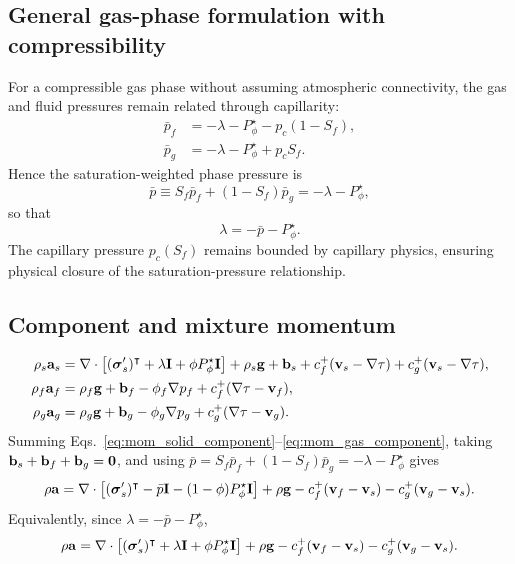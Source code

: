 \documentclass[11pt]{article}
\begin{document}
\subsection{General gas-phase formulation with compressibility}
For a compressible gas phase without assuming atmospheric connectivity, the gas and fluid pressures remain related through capillarity:
\begin{align}
\bar p_f &= -\lambda-P_\phi^\star-p_c(1-S_f),\\
\bar p_g &= -\lambda-P_\phi^\star+p_cS_f.
\label{eq:pf_pg_general}
\end{align}
Hence the saturation-weighted phase pressure is
\begin{equation}
\bar p \equiv S_f\bar p_f + (1-S_f)\bar p_g = -\lambda - P_\phi^\star,
\label{eq:pbar_mix}
\end{equation}
so that
\begin{equation}
\lambda = -\bar p - P_\phi^\star.
\label{eq:lambda_from_pbar}
\end{equation}
The capillary pressure $p_c(S_f)$ remains bounded by capillary physics, ensuring physical closure of the saturation-pressure relationship.

\subsection{Component and mixture momentum}
\begin{align}
\rho_s\mathbf{a}_s &= \nabla\cdot\left[(\boldsymbol{\sigma}_s')^\intercal+\lambda\mathbf{I}+\phi P_\phi^\star\mathbf{I}\right] + \rho_s\mathbf{g}+\mathbf{b}_s + c_f^+(\mathbf{v}_s-\nabla\tau) + c_g^+(\mathbf{v}_s-\nabla\tau),
\label{eq:mom_solid_component}\\
\rho_f\mathbf{a}_f &= \rho_f\mathbf{g}+\mathbf{b}_f-\phi_f\nabla p_f + c_f^+(\nabla\tau-\mathbf{v}_f),
\label{eq:mom_fluid_component}\\
\rho_g\mathbf{a}_g &= \rho_g\mathbf{g}+\mathbf{b}_g-\phi_g\nabla p_g + c_g^+(\nabla\tau-\mathbf{v}_g).
\label{eq:mom_gas_component}
\end{align}
Summing Eqs.~\eqref{eq:mom_solid_component}--\eqref{eq:mom_gas_component}, taking $\mathbf{b}_s+\mathbf{b}_f+\mathbf{b}_g=\mathbf{0}$, and using $\bar p = S_f\bar p_f+(1-S_f)\bar p_g = -\lambda-P_\phi^\star$ gives
\begin{equation}
\rho\mathbf{a}=\nabla\cdot\left[(\boldsymbol{\sigma}_s')^\intercal-\bar p\mathbf{I}-(1-\phi)P_\phi^\star\mathbf{I}\right]+\rho\mathbf{g}-c_f^+(\mathbf{v}_f-\mathbf{v}_s)-c_g^+(\mathbf{v}_g-\mathbf{v}_s).
\label{eq:mom_overall_main}
\end{equation}
Equivalently, since $\lambda=-\bar p-P_\phi^\star$,
\begin{equation}
\rho\mathbf{a}=\nabla\cdot\left[(\boldsymbol{\sigma}_s')^\intercal+\lambda\mathbf{I}+\phi P_\phi^\star\mathbf{I}\right]+\rho\mathbf{g}-c_f^+(\mathbf{v}_f-\mathbf{v}_s)-c_g^+(\mathbf{v}_g-\mathbf{v}_s).
\label{eq:mom_overall_lambda}
\end{equation}
\end{document}
